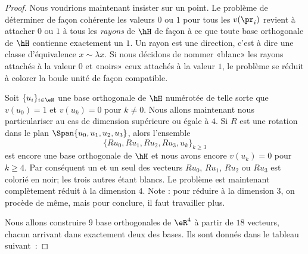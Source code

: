 \begin{proof}
    Nous voudrions maintenant insister sur un point. Le problème de déterminer de façon cohérente les valeurs \( 0\) ou \( 1\) pour tous les \( v(\pr_i)\) revient à attacher \( 0\) ou \( 1\) à tous les \emph{rayons} de \( \hH\) de façon à ce que toute base orthogonale de \( \hH\) contienne exactement un \( 1\). Un rayon est une direction, c'est à dire une classe d'équivalence \( x\sim \lambda x\). Si nous décidons de nommer «blanc»  les rayons attachés à la valeur \( 0\) et «noirs»  ceux attachés à la valeur \( 1\), le problème se réduit à colorer la boule unité de façon compatible.

    Soit \( \{ u_i \}_{i\in \eN}\) une base orthogonale de \( \hH\) numérotée de telle sorte que \( v(u_0)=1\) et \( v(u_k)=0\) pour \( k\neq 0\). Nous allons maintenant nous particulariser au cas de dimension supérieure ou égale à \( 4\). Si \( R\) est une rotation dans le plan \( \Span\{ u_0,u_1,u_2,u_3 \}\), alors l'ensemble
    \begin{equation}
        \{ Ru_0,Ru_1,Ru_2,Ru_3,u_k \}_{k\geq 3}
    \end{equation}
    est encore une base orthogonale de \( \hH\) et nous avons encore \( v(u_k)=0\) pour \( k\geq 4\). Par conséquent un et un seul des vecteurs \( Ru_0\), \( Ru_1\), \( Ru_2\) ou \( Ru_3\) est colorié en noir; les trois autres étant blancs. Le problème est maintenant complètement réduit à la dimension \( 4\). Note : pour réduire à la dimension \( 3\), on procède de même, mais pour conclure, il faut travailler plus.

    Nous allons construire \( 9\) base orthogonales de \( \eR^4\) à partir de \( 18\) vecteurs, chacun arrivant dans exactement deux des bases. Ils sont donnés dans le tableau suivant\ :



\end{proof}
